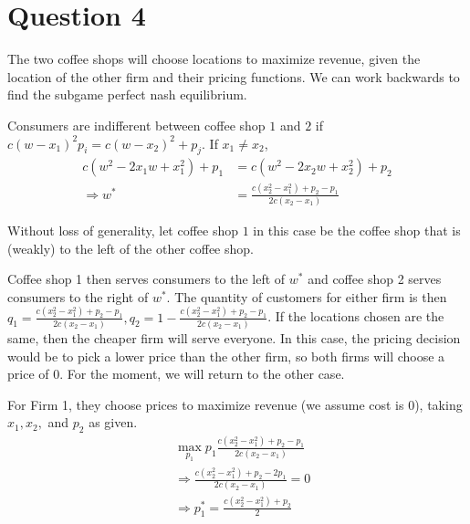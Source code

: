 \documentclass[11pt]{article} %
\begin{document}
\section{Question 4}
The two coffee shops will choose locations to maximize revenue, given the location of the other firm and their pricing functions. We can work backwards to find the subgame perfect nash equilibrium.

%
%

Consumers are indifferent between coffee shop $1$ and $2$ if $c(w-x_1)^2 p_i = c(w-x_2)^2 +p_j$.  If $x_1 \neq x_2$,
\begin{align*}
c(w^2 - 2x_1w + x_1^2) + p_1 &= c(w^2 - 2x_2w + x_2^2) + p_2\\
\Rightarrow w^{*} &= \frac{c(x_2^2 - x_1^2) + p_2 - p_1}{2c(x_2 - x_1)}
\end{align*}

Without loss of generality, let coffee shop $1$ in this case be the coffee shop that is (weakly) to the left of the other coffee shop. 

Coffee shop 1 then serves consumers to the left of $w^{*}$ and coffee shop 2 serves consumers to the right of $w^{*}$. The quantity of customers for either firm is then $q_1 = \frac{c(x_2^2 - x_1^2) + p_2 - p_1}{2c(x_2 - x_1)}, q_2 = 1-\frac{c(x_2^2 - x_1^2) + p_2 - p_1}{2c(x_2 - x_1)}$. If the locations chosen are the same, then the cheaper firm will serve everyone. In this case, the pricing decision would be to pick a lower price than the other firm, so both firms will choose a price of 0. For the moment, we will return to the other case.

For Firm 1, they choose prices to maximize revenue (we assume cost is 0), taking $x_1, x_2,$ and $p_2$ as given. 
\begin{align*}
&\max_{p_1}  p_1\frac{c(x_2^2 - x_1^2) + p_2 - p_1}{2c(x_2 - x_1)}\\
&\Rightarrow \frac{c(x_2^2 - x_1^2) + p_2 - 2p_1}{2c(x_2 - x_1)} = 0\\
&\Rightarrow p_1^{*} = \frac{c(x_2^2 - x_1^2) + p_2}{2}
\end{align*}
\end{document}
